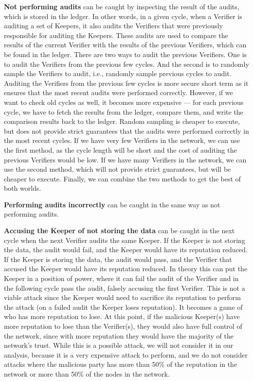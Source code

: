 \textbf{Not performing audits} can be caught by inspecting the result of the audits,
which is stored in the ledger.
In other words, in a given cycle, when a Verifier is auditing a set of Keepers,
it also audits the Verifiers that were previously responsible for auditing the Keepers.
These audits are used to compare the results of the current Verifier
with the results of the previous Verifiers, which can be found in the ledger.
There are two ways to audit the previous Verifiers.
One is to audit the Verifiers from the previous few cycles.
And the second is to randomly sample the Verifiers to audit,
i.e., randomly sample previous cycles to audit.
Auditing the Verifiers from the previous few cycles is more secure short term
as it ensures that the most recent audits were performed correctly.
However, if we want to check old cycles as well, it becomes more expensive ---
for each previous cycle, we have to fetch the results from the ledger, compare them,
and write the comparison results back to the ledger.
Random sampling is cheaper to execute, but does not provide strict guarantees
that the audits were performed correctly in the most recent cycles.
If we have very few Verifiers in the network, we can use the first method,
as the cycle length will be short and the cost of auditing the previous Verifiers would be low.
If we have many Verifiers in the network, we can use the second method,
which will not provide strict guarantees, but will be cheaper to execute.
Finally, we can combine the two methods to get the best of both worlds.

\textbf{Performing audits incorrectly} can be caught in the same way as not performing audits.

\textbf{Accusing the Keeper of not storing the data} can be caught in the next cycle
when the next Verifier audits the same Keeper.
If the Keeper is not storing the data, the audit would fail, and the Keeper would have its reputation reduced.
If the Keeper is storing the data, the audit would pass, and the Verifier that accused the Keeper
would have its reputation reduced.
In theory this can put the Keeper in a position of power, where it can fail the audit of the Verifier
and in the following cycle pass the audit, falsely accusing the first Verifier.
This is not a viable attack since the Keeper would need to sacrifice its reputation to perform the attack
(on a failed audit the Keeper loses reputation).
It becomes a game of who has more reputation to lose.
At this point, if the malicious Keeper(s) have more reputation to lose than the Verifier(s),
they would also have full control of the network,
since with more reputation they would have the majority of the network's trust.
While this is a possible attack, we will not consider it in our analysis,
because it is a very expensive attack to perform, and we do not consider
attacks where the malicious party has more than 50\% of the reputation in the network
or more than 50\% of the nodes in the network.

